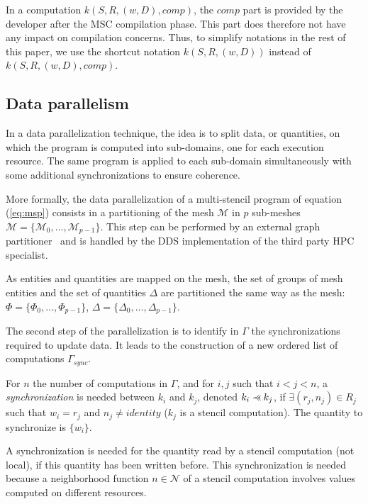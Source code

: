 In a computation $k(S,R,(w,D),comp)$, the $comp$ part is provided by the developer after the MSC compilation phase.
This part does therefore not have any impact on compilation concerns.
Thus, to simplify notations in the rest of this paper, we use the shortcut notation $k(S,R,(w,D))$ instead of $k(S,R,(w,D),comp)$.

\subsection{Data parallelism}
\label{sect:dataparal}
In a data parallelization technique, the idea is to split data, or quantities, on which the program is computed into
sub-domains, one for each execution resource.
The same program is applied to each sub-domain simultaneously with some additional synchronizations to ensure coherence.

\medskip
More formally, the data parallelization of a multi-stencil program of equation (\ref{eq:msp})
consists in a partitioning of the mesh $\mathcal{M}$ in $p$ sub-meshes $\mathcal{M}=\{\mathcal{M}_0,\dots,\mathcal{M}_{p-1}\}$.
This step can be performed by an external graph partitioner~\cite{Pellegrini:1996:SSP:645560.658570,DBLP:conf/ieeehpcs/HeleneS13,lachat:hal-00768916} and is handled by the DDS implementation of the third party HPC specialist. 

As entities and quantities are mapped on the mesh, the set of groups of mesh entities and the set of quantities $\Delta$ are partitioned the same way as the mesh: $\Phi=\{\Phi_0,\dots,\Phi_{p-1}\}$, $\Delta=\{\Delta_0,\dots,\Delta_{p-1}\}$. 

The second step of the parallelization is to identify in $\Gamma$ the synchronizations required to update data.
It leads to the construction of a new ordered list of computations $\Gamma_{sync}$.

\begin{mydef}
For $n$ the number of computations in $\Gamma$, and for $i,j$ such that $i<j<n$, a \textit{synchronization} is needed between $k_i$ and $k_j$, denoted $k_i \pprec k_j$, if $\exists (r_j,n_j) \in R_j$ such that $w_i=r_j$ and $n_j\neq identity$ ($k_j$ is a stencil computation). The quantity to synchronize is $\{w_i\}$.
\label{def:sync}
\end{mydef}

A synchronization is needed for the quantity read by a stencil computation (not local), if this quantity has been written before. This synchronization is needed because a neighborhood function $n \in \mathcal{N}$ of a stencil computation involves values computed on different resources.

